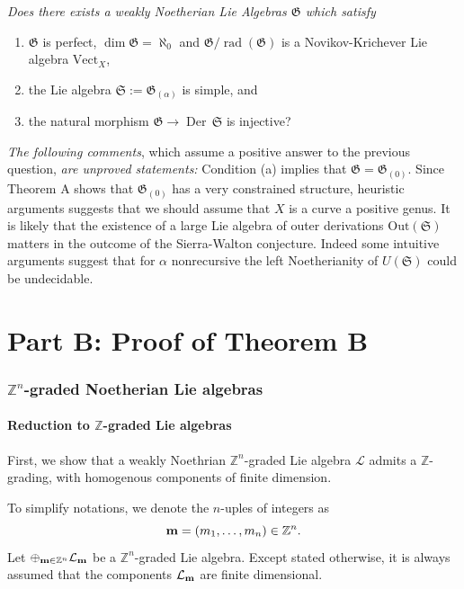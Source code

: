 \documentclass[11pt, letterpaper, reqno]{amsart}
\theoremstyle{definition}
\newcommand{\Der}{\operatorname{Der}}
\newcommand{\rad}{\operatorname{rad}}
\newcommand{\Z}{{\mathbb Z}}
\newcommand{\cL}{\mathcal L}
\newcommand{\G}{\mathfrak G}
\newcommand{\fG}{\mathfrak{G}}
\newcommand{\fS}{\mathfrak{S}}
\newcommand{\Out}{\mathrm{Out}}
\newcommand{\Vect}{\mathrm{Vect}}
\begin{document}
{\it Does there exists a  weakly Noetherian Lie Algebras 
$\fG$ which satisfy
\begin{enumerate}
\item[(a)]  $\G$ is perfect, $\dim\G=\aleph_0$ and 
$\fG/\rad(\fG)$ is a
Novikov-Krichever Lie algebra $\Vect_X$,
\item[(b)] the Lie algebra $\fS:=\fG_{(\alpha)}$ is simple, and
\item[(c)] the natural morphism $\fG\to\Der\,\fS$ is injective?
\end{enumerate}}

{\it The following comments}, which assume a positive answer to the previous question, {\it  are unproved statements:}
Condition (a) implies that $\fG=\fG_{(0)}$. 
Since Theorem A shows that $\fG_{(0)}$ has a very constrained structure, heuristic arguments suggests that we should assume 
that $X$ is a  curve a positive genus. It is likely that  the existence of a large  Lie algebra of outer derivations $\Out(\fS)$ matters in the outcome of the Sierra-Walton conjecture.
Indeed some intuitive arguments  suggest that for $\alpha$ nonrecursive  the left Noetherianity of $U(\fS)$ could be undecidable.




\part*{\hskip35mm Part B: Proof of Theorem B}







\section{$\Z^n$-graded Noetherian Lie algebras}
\label{Z-Noetherian}




\subsection{Reduction to $\Z$-graded Lie algebras}

First, we show that a weakly Noethrian
$\Z^n$-graded Lie algebra $\cL$ admits 
a $\Z$-grading, with homogenous components of finite dimension.

To simplify notations, we denote the $n$-uples
of integers as 
$${\bf m}=(m_1,\ldots,m_n)\in \Z^n.$$
Let $\oplus_{{\bf m}\in\Z^n}\cL_{\bf m}$
be a $\Z^n$-graded Lie algebra. 
Except stated otherwise, it is always assumed that the components $\cL_{\bf m}$ are finite dimensional.
\end{document}
